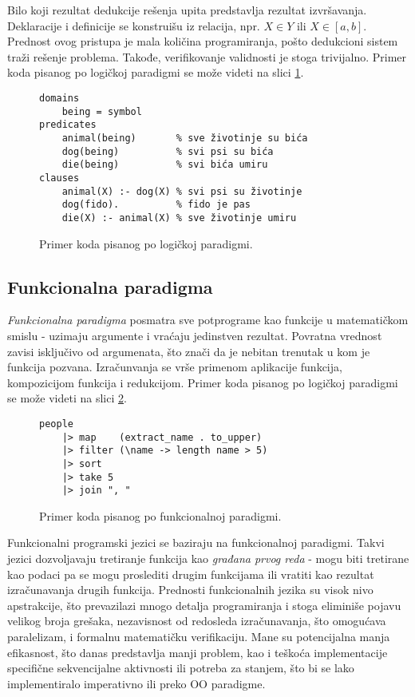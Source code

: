 Bilo koji rezultat dedukcije rešenja upita predstavlja rezultat izvršavanja. Deklaracije i definicije se konstruišu iz relacija, npr. $X \in Y$ ili $X \in [a,b]$. Prednost ovog pristupa je mala količina programiranja, pošto dedukcioni sistem traži rešenje problema. Takođe, verifikovanje validnosti je stoga trivijalno. Primer koda pisanog po logičkoj paradigmi se može videti na slici \ref{fig:ParadigmLogical}.

\begin{figure}[h!]
\begin{lstlisting}
domains
    being = symbol 
predicates
    animal(being)       % sve životinje su bića
    dog(being)          % svi psi su bića
    die(being)          % svi bića umiru 
clauses
    animal(X) :- dog(X) % svi psi su životinje
    dog(fido).          % fido je pas
    die(X) :- animal(X) % sve životinje umiru 
\end{lstlisting}
\caption{Primer koda pisanog po logičkoj paradigmi.}
\label{fig:ParadigmLogical}
\end{figure}


\subsection{Funkcionalna paradigma}
\label{subsec:ParadigmFunctional}

\emph{Funkcionalna paradigma} posmatra sve potprograme kao funkcije u matematičkom smislu - uzimaju argumente i vraćaju jedinstven rezultat. Povratna vrednost zavisi isključivo od argumenata, što znači da je nebitan trenutak u kom je funkcija pozvana. Izračunvanja se vrše primenom aplikacije funkcija, kompozicijom funkcija i redukcijom. Primer koda pisanog po logičkoj paradigmi se može videti na slici \ref{fig:ParadigmFunctional}.

\begin{figure}[h!]
\begin{lstlisting}
people 
    |> map    (extract_name . to_upper) 
    |> filter (\name -> length name > 5) 
    |> sort
    |> take 5
    |> join ", "
\end{lstlisting}
\caption{Primer koda pisanog po funkcionalnoj paradigmi.}
\label{fig:ParadigmFunctional}
\end{figure}
    
Funkcionalni programski jezici se baziraju na funkcionalnoj paradigmi. Takvi jezici dozvoljavaju tretiranje funkcija kao \emph{građana prvog reda} - mogu biti tretirane kao podaci pa se mogu proslediti drugim funkcijama ili vratiti kao rezultat izračunavanja drugih funkcija. Prednosti funkcionalnih jezika su visok nivo apstrakcije, što prevazilazi mnogo detalja programiranja i stoga eliminiše pojavu velikog broja grešaka, nezavisnost od redosleda izračunavanja, što omogućava paralelizam, i formalnu matematičku verifikaciju. Mane su potencijalna manja efikasnost, što danas predstavlja manji problem, kao i teškoća implementacije specifične sekvencijalne aktivnosti ili potreba za stanjem, što bi se lako implementiralo imperativno ili preko OO paradigme.


